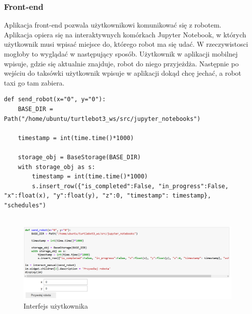 \documentclass[12pt]{article}
\newcommand{\vsp}{\vspace{0.5cm}}
\begin{document}
\newpage
\subsubsection*{Front-end}

Aplikacja front-end pozwala użytkownikowi komunikować się z robotem. Aplikacja opiera się na interaktywnych komórkach Jupyter Notebook, w których użytkownik musi wpisać miejsce do, którego robot ma się udać. W rzeczywistosci mogłoby to wyglądać w następujący sposób. Użytkownik w aplikacji mobilnej wpisuje, gdzie się aktualnie znajduje, robot do niego przyjeżdża. Następnie po wejściu do taksówki użytkownik wpisuje w aplikacji dokąd chcę jechać, a robot taxi go tam zabiera.

\vsp\vsp

\begin{lstlisting}
def send_robot(x="0", y="0"):
    BASE_DIR = Path("/home/ubuntu/turtlebot3_ws/src/jupyter_notebooks")

    timestamp = int(time.time()*1000)

    storage_obj = BaseStorage(BASE_DIR)
    with storage_obj as s:
        timestamp = int(time.time()*1000)
        s.insert_row({"is_completed":False, "in_progress":False, "x":float(x), "y":float(y), "z":0, "timestamp": timestamp}, "schedules")
    
\end{lstlisting}
    
\vsp\vsp

\begin{figure}[!htb]
    \centering
    \includegraphics[width=18cm]{./images/interact.png}
    \caption{Interfejs użytkownika}
\end{figure}
\end{document}

